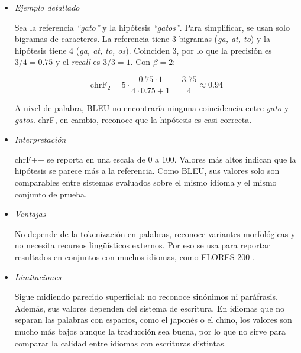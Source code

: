 \begin{itemize}
donde $\beta$ indica cuántas veces más importa el \textit{recall} que la precisión. El valor usual es $\beta = 2$ \cite{popovic2015chrf}. chrF++ usa la misma fórmula, pero el promedio incluye los n-gramas de caracteres de orden 1 a 6 y los de palabras de orden 1 a 2 \cite{popovic2017chrfpp}.
 
\item \textit{Ejemplo detallado} \\
\vspace{-0.5cm}
 
Sea la referencia \textit{``gato''} y la hipótesis \textit{``gatos''}. Para simplificar, se usan solo bigramas de caracteres. La referencia tiene 3 bigramas (\textit{ga, at, to}) y la hipótesis tiene 4 (\textit{ga, at, to, os}). Coinciden 3, por lo que la precisión es $3/4 = 0.75$ y el \textit{recall} es $3/3 = 1$. Con $\beta = 2$:
 
\begin{equation}
\text{chrF}_2 = 5 \cdot \frac{0.75 \cdot 1}{4 \cdot 0.75 + 1} = \frac{3.75}{4} \approx 0.94
\end{equation}
 
A nivel de palabra, BLEU no encontraría ninguna coincidencia entre \textit{gato} y \textit{gatos}. chrF, en cambio, reconoce que la hipótesis es casi correcta.
 
\item \textit{Interpretación} \\
\vspace{-0.5cm}
 
chrF++ se reporta en una escala de 0 a 100. Valores más altos indican que la hipótesis se parece más a la referencia. Como BLEU, sus valores solo son comparables entre sistemas evaluados sobre el mismo idioma y el mismo conjunto de prueba.
 
\item \textit{Ventajas} \\
\vspace{-0.5cm}
 
No depende de la tokenización en palabras, reconoce variantes morfológicas y no necesita recursos lingüísticos externos. Por eso se usa para reportar resultados en conjuntos con muchos idiomas, como FLORES-200 \cite{nllbteamNoLanguageLeft2022}.
 
\item \textit{Limitaciones} \\
\vspace{-0.5cm}
 
Sigue midiendo parecido superficial: no reconoce sinónimos ni paráfrasis. Además, sus valores dependen del sistema de escritura. En idiomas que no separan las palabras con espacios, como el japonés o el chino, los valores son mucho más bajos aunque la traducción sea buena, por lo que no sirve para comparar la calidad entre idiomas con escrituras distintas.
 
    
\end{itemize}
 
